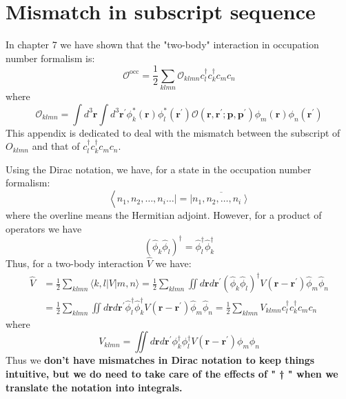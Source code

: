 \appendix
\section{Mismatch in subscript sequence}
In chapter 7 we have shown that the "two-body" interaction in occupation number formalism is:
\begin{equation}\mathcal{O}^{\mathrm{occ}}=\frac{1}{2} \sum_{k l m n} \mathcal{O}_{k l m n} c_{l}^{\dagger} c_{k}^{\dagger} c_{m} c_{n}\end{equation}
where
\begin{equation}\mathcal{O}_{k l m n}=\int d^{3} \mathbf{r} \int d^{3} \mathbf{r}^{\prime} \phi_{k}^{*}(\mathbf{r}) \phi_{l}^{*}\left(\mathbf{r}^{\prime}\right) \mathcal{O}\left(\mathbf{r}, \mathbf{r}^{\prime} ; \mathbf{p}, \mathbf{p}^{\prime}\right) \phi_{m}(\mathbf{r}) \phi_{n}\left(\mathbf{r}^{\prime}\right)\end{equation}
This appendix is dedicated to deal with the mismatch between the subscript of $O_{klmn}$ and that of $c^{\dagger}_lc^{\dagger}_kc_mc_n$.

Using the Dirac notation, we have, for a state in the occupation number formalism: 
\begin{equation}\left\langle n_{1}, n_{2}, \ldots, n_{i} \ldots|=| \overline{\left.n_{1}, n_{2}, \ldots, n_{i}\right\rangle}\right.\end{equation}
where the overline means the Hermitian adjoint. However, for a product of operators we have
\begin{equation}\left(\hat{\phi}_{k} \hat{\phi}_{l}\right)^{\dagger}=\hat{\phi}_{l}^{\dagger} \hat{\phi}_{k}^{\dagger}\end{equation}
Thus, for a two-body interaction $\hat{V}$ we have:
\begin{equation}\begin{aligned}
\hat{V} &=\frac{1}{2} \sum_{k l m n}\langle k, l|V| m, n\rangle=\frac{1}{2} \sum_{k l m n} \iint d \mathbf{r} d \mathbf{r}^{\prime}\left(\hat{\phi}_{k} \hat{\phi}_{l}\right)^{\dagger} V\left(\mathbf{r}-\mathbf{r}^{\prime}\right) \hat{\phi}_{m} \hat{\phi}_{n} \\
&=\frac{1}{2} \sum_{k l m n} \iint d \mathbf{r} d \mathbf{r}^{\prime} \hat{\phi}_{l}^{\dagger} \hat{\phi}_{k}^{\dagger} V\left(\mathbf{r}-\mathbf{r}^{\prime}\right) \hat{\phi}_{m} \hat{\phi}_{n}=\frac{1}{2} \sum_{k l m n} V_{k l m n} c_{l}^{\dagger} c_{k}^{\dagger} c_{m} c_{n}
\end{aligned}\end{equation}
where 
\begin{equation}V_{k l m n}=\iint d \mathbf{r} d \mathbf{r}^{\prime} \phi_{k}^{\dagger} \phi_{l}^{\dagger} V\left(\mathbf{r}-\mathbf{r}^{\prime}\right) \phi_{m} \phi_{n}\end{equation}
Thus we \textbf{don't have mismatches in Dirac notation to keep things intuitive, but we do need to take care of the effects of " † " when we translate the notation into integrals.}